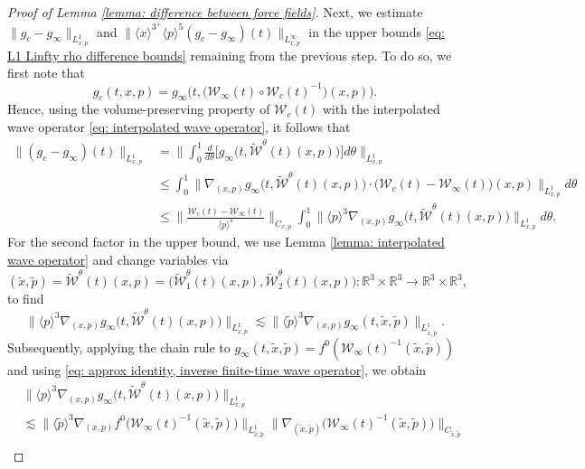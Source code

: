 \documentclass[10pt,a4paper]{amsart}
\begin{document}
\begin{proof}[Proof of Lemma \ref{lemma: difference between force fields}]
\noindent Next, we estimate $\|g_c-g_\infty\|_{L_{x,p}^1}$ and
$\|\langle x\rangle^{3^+}\langle p\rangle^{5}(g_c-g_\infty)(t)\|_{L^\infty_{x,p}}$
in the upper bounds \eqref{eq: L1 Linfty rho difference bounds} remaining from the previous step. To do so, we first note that 
$$g_c(t,x,p)=g_\infty\Big(t,\big(\mathcal{W}_\infty(t)\circ\mathcal{W}_c(t)^{-1}\big)(x,p)\Big).$$
Hence, using the volume-preserving property of $\mathcal{W}_c(t)$ with the interpolated wave operator \eqref{eq: interpolated wave operator}, it follows that 
$$\begin{aligned}
\|(g_c-g_\infty)
(t)\|_{L_{x,p}^1}&=\bigg\|\int_0^1 \frac{d}{d\theta}\Big[g_\infty\Big (t, \widetilde{\mathcal{W}}^\theta(t)(x,p)\Big)\Big] d\theta\bigg\|_{L_{x,p}^1}\\
&\leq\int_0^1\Big\|\nabla_{(x,p)}g_\infty\Big(t,\widetilde{\mathcal{W}}^\theta(t)(x,p)\Big)\cdot\Big(\mathcal{W}_c(t)-\mathcal{W}_\infty(t)\Big)(x,p)\Big\|_{L_{x,p}^1}d\theta\\
&\leq\bigg\|\frac{\mathcal{W}_c(t)-\mathcal{W}_\infty(t)}{\langle p\rangle^3}\bigg\|_{C_{x,p}}\int_0^1\Big\|\langle p\rangle^3\nabla_{(x,p)}g_\infty\Big(t,\widetilde{\mathcal{W}}^\theta(t)(x,p)\Big)\Big\|_{L_{x,p}^1}d\theta.
\end{aligned}$$
For the second factor in the upper bound, we use Lemma \ref{lemma: interpolated wave operator} and change variables via $$(\tilde{x},\tilde{p})=\widetilde{\mathcal{W}}^\theta(t)(x,p)=\Big(\widetilde{\mathcal{W}}_1^\theta(t)(x,p), \widetilde{\mathcal{W}}_2^\theta(t)(x,p)\Big): \mathbb{R}^3\times\mathbb{R}^3\to \mathbb{R}^3\times\mathbb{R}^3,$$ 
to find 
$$\Big\|\langle p\rangle^3\nabla_{(x,p)}g_\infty\Big(t,\widetilde{\mathcal{W}}^\theta(t)(x,p)\Big)\Big\|_{L_{x,p}^1}\lesssim\big\|\langle \tilde{p}\rangle^3\nabla_{(x,p)}g_\infty(t, \tilde{x}, \tilde{p})\big\|_{L_{\tilde{x},\tilde{p}}^1}.$$
Subsequently, applying the chain rule to $g_\infty(t,\tilde{x},\tilde{p})=f^0(\mathcal{W}_\infty(t)^{-1}(\tilde{x},\tilde{p}))$ and using \eqref{eq: approx identity, inverse finite-time wave operator}, we obtain
$$\begin{aligned}
&\Big\|\langle p\rangle^3\nabla_{(x,p)}g_\infty\Big(t,\widetilde{\mathcal{W}}^\theta(t)(x,p)\Big)\Big\|_{L_{x,p}^1}\\
&\lesssim\Big\|\langle \tilde{p}\rangle^3\nabla_{(x,p)}f^0\Big(\mathcal{W}_\infty(t)^{-1}(\tilde{x},\tilde{p})\Big)\Big\|_{L_{\tilde{x},\tilde{p}}^1}\Big\|\nabla_{(\tilde{x},\tilde{p})}\Big(\mathcal{W}_\infty(t)^{-1}(\tilde{x},\tilde{p})\Big)\Big\|_{C_{\tilde{x},\tilde{p}}}\\

\end{aligned}$$
\end{proof}
\end{document}
